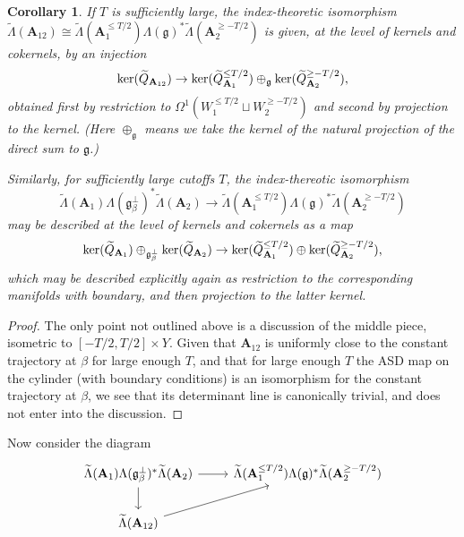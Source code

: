\documentclass[10pt,a4paper]{amsart}
\newtheorem{corollary}[theorem]{Corollary}
\theoremstyle{definition}
\theoremstyle{remark}
\numberwithin{figure}{qchap}
\begin{document}
\begin{corollary}If $T$ is sufficiently large, the index-theoretic isomorphism $\widetilde{\Lambda}(\mathbf{A}_{12}) \cong \widetilde{\Lambda}(\mathbf{A}_1^{\leq T/2}) \Lambda(\mathfrak g)^* \widetilde{\Lambda}(\mathbf{A}_2^{\geq -T/2})$ is given, at the level of kernels and cokernels, by an injection $$\textup{ker}(\widetilde{Q}_{\mathbf{A}_{12}}) \to \textup{ker}(\widetilde{Q}^{\leq T/2}_{\mathbf{A}_1}) \oplus_{\mathfrak g} \textup{ker}(\widetilde Q^{\geq -T/2}_{\mathbf{A}_2}),$$ obtained first by restriction to $\Omega^1(W_1^{\leq T/2} \sqcup W_2^{\geq -T/2})$ and second by projection to the kernel. (Here $\oplus_{\mathfrak g}$ means we take the kernel of the natural projection of the direct sum to $\mathfrak g$.)

Similarly, for sufficiently large cutoffs $T$, the index-thereotic isomorphism $$\widetilde{\Lambda}(\mathbf{A}_1) \Lambda(\mathfrak g_\beta^\perp)^* \widetilde{\Lambda}(\mathbf{A}_2) \to \widetilde{\Lambda}(\mathbf{A}_1^{\leq T/2}) \Lambda(\mathfrak g)^*  \widetilde{\Lambda}(\mathbf{A}_2^{\geq -T/2})$$ may be described at the level of kernels and cokernels as a map $$\textup{ker}(\widetilde Q_{\mathbf{A}_1}) \oplus_{\mathfrak g_\beta^\perp} \textup{ker}(\widetilde Q_{\mathbf{A}_2}) \to \textup{ker}(\widetilde Q^{\leq T/2}_{\mathbf{A}_1}) \oplus \textup{ker}(\widetilde Q^{\geq -T/2}_{\mathbf{A}_2}),$$ which may be described explicitly again as restriction to the corresponding manifolds with boundary, and then projection to the latter kernel.
\end{corollary}
\begin{proof}The only point not outlined above is a discussion of the middle piece, isometric to $[-T/2, T/2] \times Y$. Given that $\mathbf{A}_{12}$ is uniformly close to the constant trajectory at $\beta$ for large enough $T$, and that for large enough $T$ the ASD map on the cylinder (with boundary conditions) is an isomorphism for the constant trajectory at $\beta$, we see that its determinant line is canonically trivial, and does not enter into the discussion.
\end{proof}

Now consider the diagram
\[
\begin{tikzcd}\widetilde{\Lambda}(\mathbf{A}_1) \Lambda(\mathfrak g_\beta^\perp)^* \widetilde{\Lambda}(\mathbf{A}_2) \arrow{r} \arrow{d} & \widetilde{\Lambda}(\mathbf{A}_1^{\leq T/2}) \Lambda(\mathfrak g)^* \widetilde{\Lambda}(\mathbf{A}_2^{\geq -T/2}) \\
\widetilde{\Lambda}(\mathbf{A}_{12}) \arrow{ur}
\end{tikzcd}
\]
\end{document}
